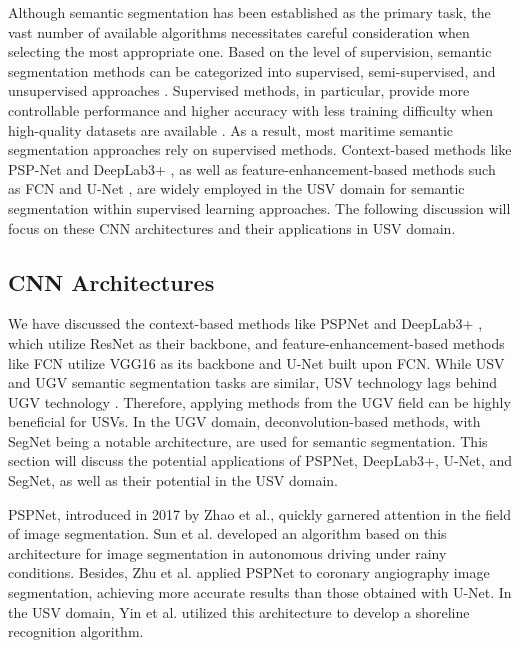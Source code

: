 Although semantic segmentation has been established as the primary task, the vast number of available algorithms 
necessitates careful consideration when selecting the most appropriate one. Based on the level of supervision, 
semantic segmentation methods can be categorized into supervised, semi-supervised, and unsupervised approaches 
\cite{SSsurvey}. Supervised methods, in particular, provide more controllable performance and higher accuracy 
with less training difficulty when high-quality datasets are available \cite{semisupervised}. As a result, most 
maritime semantic segmentation approaches rely on supervised methods. Context-based methods like PSP-Net 
\cite{PSPNet} and DeepLab3+ \cite{Deeplab3+}, as well as feature-enhancement-based methods such as FCN 
\cite{FCN} and U-Net \cite{UNet}, are widely employed in the USV domain for semantic segmentation within 
supervised learning approaches. The following discussion will focus on these CNN architectures and their 
applications in USV domain.

\subsection{CNN Architectures}
We have discussed the context-based methods like PSPNet \cite{PSPNet} and DeepLab3+ \cite{Deeplab3+}, 
which utilize ResNet \cite{resnet} as their backbone, and feature-enhancement-based methods like FCN utilize 
VGG16 \cite{VGG} as its backbone and U-Net \cite{UNet} built upon FCN. While USV and UGV semantic segmentation 
tasks are similar, USV technology lags behind UGV technology \cite{MaSTr1325}. Therefore, applying methods from 
the UGV field can be highly beneficial for USVs. In the UGV domain, deconvolution-based methods, with SegNet 
\cite{SegNet} being a notable architecture, are used for semantic segmentation. This section will discuss the 
potential applications of PSPNet, DeepLab3+, U-Net, and SegNet, as well as their potential in the USV domain.

PSPNet, introduced in 2017 by Zhao et al.\cite{PSPNet}, quickly garnered attention in the field of image 
segmentation. Sun et al.\cite{pspnet-ugv} developed an algorithm based on this architecture for image 
segmentation in autonomous driving under rainy conditions. Besides, Zhu et al.\cite{pspnet-cad} applied PSPNet 
to coronary angiography image segmentation, achieving more accurate results than those obtained with U-Net. 
In the USV domain, Yin et al. \cite{pspnet-shoreline} utilized this architecture to develop a shoreline 
recognition algorithm.

